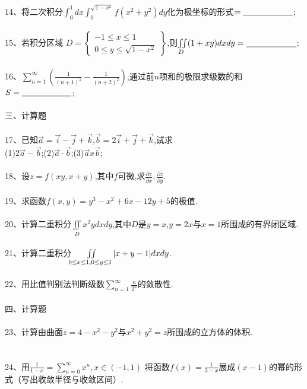 \documentclass[12pt,a3paper]{article}
\begin{document}
\\\\
14、将二次积分$\int_0^1dx\int_0^{\sqrt{1-x^2}}f(x^2+y^2)dy$化为极坐标的形式$=\underline{\makebox[6em]{}}$;
\\\\
15、若积分区域
$D = \left.
\begin{cases}
  -1 \leq x \leq 1 \\
  0 \leq y \leq \sqrt{1-x^2}
\end{cases}
\right\}
$,则$\iint\limits_D (1+xy)dxdy=\underline{\makebox[6em]{}}$;
\\\\
16、$\sum\limits_{n=1}^\infty(\frac{1}{(n+1)^2}-\frac{1}{(n+2)^2})$,通过前$n$项和的极限求级数的和$S=\underline{\makebox[6em]{}}$;
\\\\
三、计算题
\\\\
17、已知$\vec{a}=\vec{i}-\vec{j}+\vec{k}$,$\vec{b}=2\vec{i}+\vec{j}+\vec{k}$,试求\\
(1)$2\vec{a}-\vec{b}$;(2)$\vec{a}\cdot\vec{b}$;(3)$\vec{a}x\vec{b}$;
\\\\
18、设$z=f(xy,x+y)$,其中$f$可微,求$\frac{\partial z}{\partial x}, \frac{\partial z}{\partial y}$.
\\\\
19、求函数$f(x,y)=y^3-x^2+6x-12y+5$的极值.
\\\\
20、计算二重积分$\iint\limits_D x^2ydxdy$,其中$D$是$y=x$,$y=2x$与$x=1$所围成的有界闭区域.
\\\\
21、计算二重积分$\iint\limits_{0\leq x\leq 1, \\0\leq y\leq 1}|x+y-1|dxdy$.
\\\\
22、用比值判别法判断级数$\sum\limits_{n=1}^\infty\frac{n}{2^n}$的敛散性.
\\\\
四、计算题
\\\\
23、计算由曲面$z=4-x^2-y^2$与$x^2+y^2=z$所围成的立方体的体积.
\\\\\\
24、用$\frac{1}{1-x}=\sum\limits_{n=0}^\infty x^n,x\in (-1,1)$ 将函数$f(x)=\frac{1}{3-x}$展成$(x-1)$的幂的形式（写出收敛半径与收敛区间）.
\end{document}
